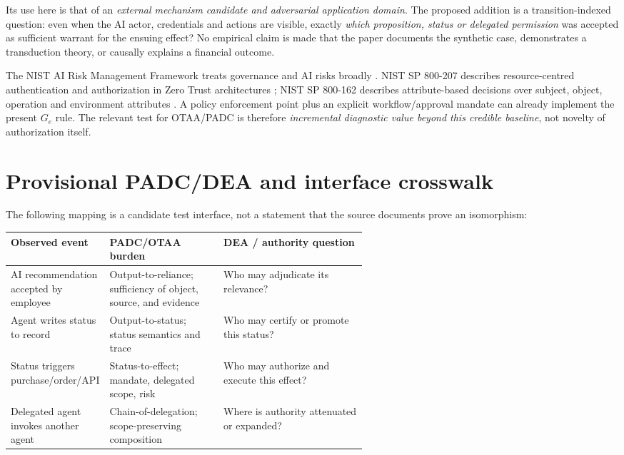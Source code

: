 \documentclass[11pt,a4paper]{article}
\begin{document}
Its use here is that of an \emph{external mechanism candidate and adversarial application domain}. The proposed addition is a transition-indexed question: even when the AI actor, credentials and actions are visible, exactly \emph{which proposition, status or delegated permission} was accepted as sufficient warrant for the ensuing effect? No empirical claim is made that the paper documents the synthetic case, demonstrates a transduction theory, or causally explains a financial outcome.

The NIST AI Risk Management Framework treats governance and AI risks broadly \cite{nist2023}. NIST SP 800-207 describes resource-centred authentication and authorization in Zero Trust architectures \cite{rose2020}; NIST SP 800-162 describes attribute-based decisions over subject, object, operation and environment attributes \cite{hu2019}. A policy enforcement point plus an explicit workflow/approval mandate can already implement the present $G_e$ rule. The relevant test for OTAA/PADC is therefore \emph{incremental diagnostic value beyond this credible baseline}, not novelty of authorization itself.

\section{Provisional PADC/DEA and interface crosswalk}
The following mapping is a candidate test interface, not a statement that the source documents prove an isomorphism:
\begin{center}
\small
\begin{tabularx}{\linewidth}{@{}P{0.26\linewidth}P{0.32\linewidth}Y@{}}
\toprule
\textbf{Observed event} & \textbf{PADC/OTAA burden} & \textbf{DEA / authority question}\\
\midrule
AI recommendation accepted by employee & Output-to-reliance; sufficiency of object, source, and evidence & Who may adjudicate its relevance?\\
Agent writes status to record & Output-to-status; status semantics and trace & Who may certify or promote this status?\\
Status triggers purchase/order/API & Status-to-effect; mandate, delegated scope, risk & Who may authorize and execute this effect?\\
Delegated agent invokes another agent & Chain-of-delegation; scope-preserving composition & Where is authority attenuated or expanded?\\
\bottomrule
\end{tabularx}
\end{center}
\end{document}
